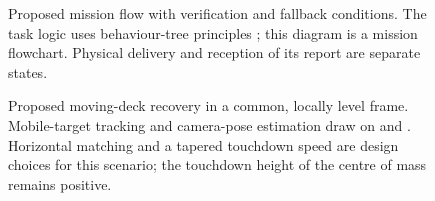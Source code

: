 \begin{figure}[htbp]
\centering
{}
\caption{Proposed mission flow with verification and fallback conditions. The task logic uses behaviour-tree principles \citep{Colledanchise2018}; this diagram is a mission flowchart. Physical delivery and reception of its report are separate states.}
\label{fig:mission}
\end{figure}

\begin{figure}[htbp]
\centering
{}
\caption{Proposed moving-deck recovery in a common, locally level frame. Mobile-target tracking and camera-pose estimation draw on \citet{Borowczyk2017} and \citet{Lepetit2009}. Horizontal matching and a tapered touchdown speed are design choices for this scenario; the touchdown height of the centre of mass remains positive.}
\label{fig:recovery}
\end{figure}
